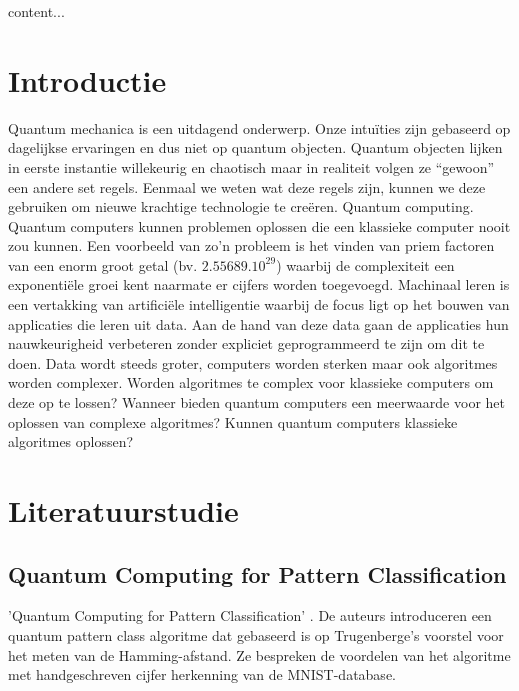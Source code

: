 
    content...
\section{Introductie} %
\label{sec:introductie}

Quantum mechanica is een uitdagend onderwerp. Onze intuïties zijn gebaseerd op dagelijkse ervaringen en dus niet op quantum objecten. Quantum objecten lijken in eerste instantie willekeurig en chaotisch maar in realiteit volgen ze “gewoon” een andere set regels. Eenmaal we weten wat deze regels zijn, kunnen we deze gebruiken om nieuwe krachtige technologie te creëren. Quantum computing. 
Quantum computers kunnen problemen oplossen die een klassieke computer nooit zou kunnen. Een voorbeeld van zo’n probleem is het vinden van priem factoren van een enorm groot getal (bv. \(2.55689.10^{29}\)) waarbij de complexiteit een exponentiële groei kent naarmate er cijfers worden toegevoegd.
Machinaal leren is een vertakking van artificiële intelligentie waarbij de focus ligt op het bouwen van applicaties die leren uit data. Aan de hand van deze data gaan de applicaties hun nauwkeurigheid verbeteren zonder expliciet geprogrammeerd te zijn om dit te doen. Data wordt steeds groter, computers worden sterken maar ook algoritmes worden complexer.
Worden algoritmes te complex voor klassieke computers om deze op te lossen? Wanneer bieden quantum computers een meerwaarde voor het oplossen van complexe algoritmes? Kunnen quantum computers klassieke algoritmes oplossen?



\section{Literatuurstudie}
\label{sec:state-of-the-art}
\subsection{Quantum Computing for Pattern Classification}
'Quantum Computing for Pattern Classification' 
\autocite{Maria Schuld, Ilya Sinayskiy, and Francesco Pertruccione, 2014}. De auteurs introduceren een quantum pattern class algoritme dat gebaseerd is op Trugenberge’s voorstel voor het meten van de Hamming-afstand. Ze bespreken de voordelen van het algoritme met handgeschreven cijfer herkenning van de MNIST-database. 

